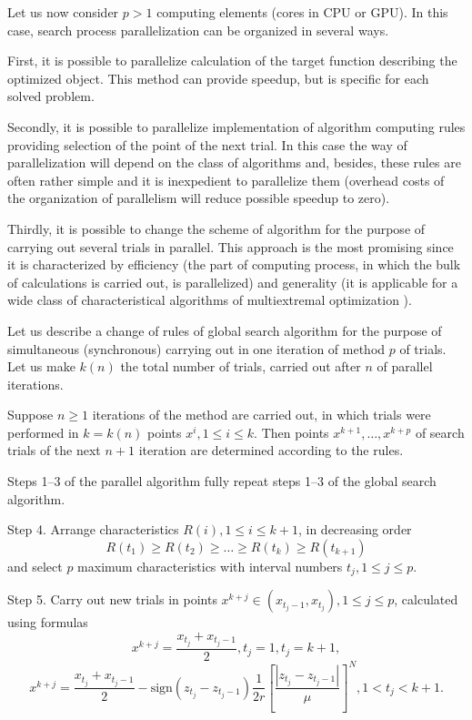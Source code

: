 \documentclass[smallcondensed]{svjour3}     %
\begin{document}
Let us now consider $p>1$ computing elements (cores in CPU or GPU). In this case, search process parallelization can be organized in several ways.

First, it is possible to parallelize calculation of the target function describing the optimized object. This method can provide speedup, but is specific for each solved problem.

Secondly, it is possible to parallelize implementation of algorithm computing rules providing selection of the point of the next trial. In this case the way of parallelization will depend on the class of algorithms and, besides, these rules are often rather simple and it is inexpedient to parallelize them (overhead costs of the organization of parallelism will reduce possible speedup to zero).

Thirdly, it is possible to change the scheme of algorithm for the purpose of carrying out several trials in parallel. This approach is the most promising since it is characterized by efficiency (the part of computing process, in which the bulk of calculations is carried out, is parallelized) and generality (it is applicable for a wide class of characteristical algorithms of multiextremal optimization \cite{RefGrishagin1997}).

Let us describe a change of rules of global search algorithm for the purpose of simultaneous (synchronous) carrying out in one iteration of method $p$ of trials. Let us make $k(n)$ the total number of trials, carried out after $n$ of parallel iterations.

Suppose $n\geq 1$  iterations of the method are carried out, in which trials were performed in $k=k(n)$ points $x^i,1\leq i \leq k$. Then points $x^{k+1},\dots,x^{k+p}$  of search trials of the next $n+1$ iteration are determined according to the rules.

Steps 1--3 of the parallel algorithm fully repeat steps 1--3 of the global search algorithm.

Step 4. Arrange characteristics  $R(i), 1 \leq i \leq k+1$, in decreasing order 
\begin{equation}\label{eq:21}
R(t_1)\geq R(t_2)\geq \dots \geq R(t_{k}) \geq R(t_{k+1})
\end{equation}
and select $p$ maximum characteristics with interval numbers $t_j, 1\leq j \leq p$.

Step 5. Carry out new trials in points $x^{k+j}\in(x_{t_j-1},x_{t_j}), 1\leq j\leq p$, calculated using formulas
\[
x^{k+j} = \frac{x_{t_j}+x_{t_j-1}}{2}, t_j=1, t_j=k+1,
\]
\[
x^{k+j} = \frac{x_{t_j}+x_{t_j-1}}{2} - \mathrm{sign}(z_{t_j}-z_{t_j-1})\frac{1}{2r}\left[\frac{\left|z_{t_j}-z_{t_j-1}\right|}{\mu}\right]^N, 1<t_j<k+1.
\]
\end{document}
